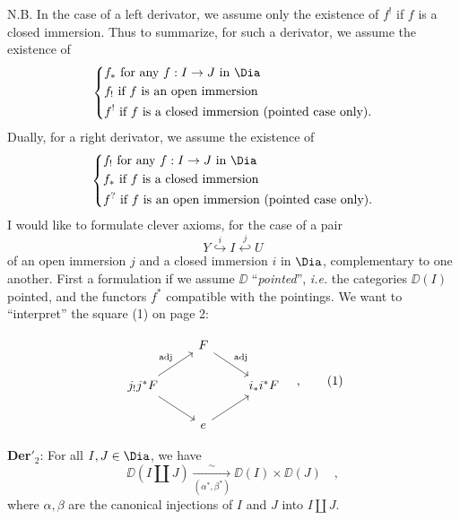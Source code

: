 N.B. In the case of a left derivator, we assume only the existence of $f^!$ if $f$ is a closed immersion. Thus to summarize, for such a derivator, we assume the existence of
\[
\left\{
\begin{aligned}
& f_* \text{ for any } f : I \to J \text{ in } \Dia \\
& f_! \text{ if } f \text{ is an open immersion} \\
& f^! \text{ if } f \text{ is a closed immersion (pointed case only).}
\end{aligned}
\right.
\]
Dually, for a right derivator, we assume the existence of
\[
\left\{
\begin{aligned}
& f_! \text{ for any } f : I \to J \text{ in } \Dia \\
& f_* \text{ if } f \text{ is a closed immersion} \\
& f^? \text{ if } f \text{ is an open immersion (pointed case only).}
\end{aligned}
\right.
\]
I would like to formulate clever axioms, for the case of a pair
\[ Y \overset{i}{\hookrightarrow} I \overset{j}{\hookleftarrow} U \]
of an open immersion $j$ and a closed immersion $i$ in $\Dia$, complementary to one another. First a formulation if we assume $\DD$ ``\textit{pointed}'', \textit{i.e.} the categories $\DD(I)$ pointed, and the functors $f^*$ compatible with the pointings. We want to ``interpret'' the square (1) on page 2:


\[
\begin{tikzcd}
& F \arrow[dr, "\mathrm{adj}"] & \\
j_!j^*F \arrow[ur, "\mathrm{adj}"] \arrow[dr] & & i_*i^*F \\
& e \arrow[ur] &
\end{tikzcd}
\quad ,
\tag*{(1)}
\]

\textbf{Der}$'_2$: For all $I, J \in \Dia$, we have
\[ \DD(I \amalg J) \xrightarrow[(\alpha^*, \beta^*)]{\sim} \DD(I) \times \DD(J) \quad , \]
where $\alpha, \beta$ are the canonical injections of $I$ and $J$ into $I \amalg J$.


